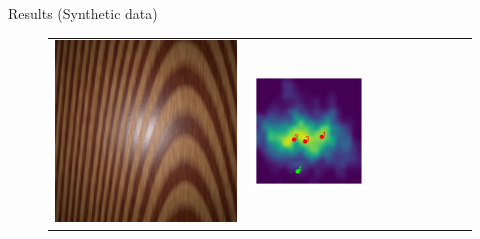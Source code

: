 \documentclass[final]{beamer}
\newlength{\twocolwid}
\newlength{\resultwidth}
\begin{document}
\begin{frame}[t]
\begin{columns}[t]
\begin{column}{\twocolwid}
\begin{block}{Results (Synthetic data)}
\begin{figure}[t]
\begin{tabular}{ccrclcccc}
            		\includegraphics[width=\resultwidth]{images/synth/wood/optim.jpg} &
            		\includegraphics[width=\resultwidth]{images/synth/wood/posterior.pdf} &

\end{tabular}
\end{figure}
\end{block}
\end{column}
\end{columns}
\end{frame}
\end{document}
